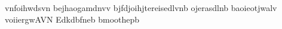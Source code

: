 vnfoihwdsvn
bejhaogamdnvv
bjfdjoihjtereisedlvnb
ojerasdlnb
baoieotjwalv
voiiergwAVN
Edkdbfneb
bmoothepb


